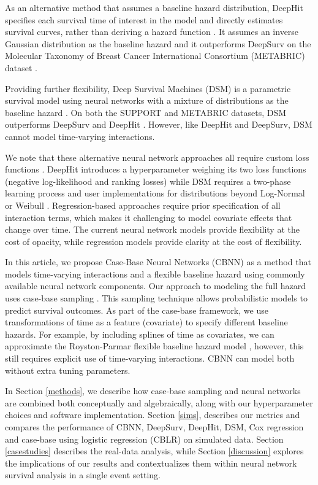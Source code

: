 \documentclass[AMA,STIX1COL,]{WileyNJD-v2}
\begin{document}
As an alternative method that assumes a baseline hazard distribution,
DeepHit specifies each survival time of interest in the model and
directly estimates survival curves, rather than deriving a hazard
function \citep{lee2018DeepHit}. It assumes an inverse Gaussian
distribution as the baseline hazard and it outperforms DeepSurv on the
Molecular Taxonomy of Breast Cancer International Consortium (METABRIC)
dataset \citep{curtis2012genomic}.

Providing further flexibility, Deep Survival Machines (DSM) is a
parametric survival model using neural networks with a mixture of
distributions as the baseline hazard \citep{dsmPaper}. On both the
SUPPORT and METABRIC datasets, DSM outperforms DeepSurv and DeepHit
\citep{dsmPaper}. However, like DeepHit and DeepSurv, DSM cannot model
time-varying interactions.

We note that these alternative neural network approaches all require
custom loss functions \citep{katzman2018DeepSurv} \citep{lee2018DeepHit}
\citep{dsmPaper}. DeepHit introduces a hyperparameter weighing its two
loss functions (negative log-likelihood and ranking losses) while DSM
requires a two-phase learning process and user implementations for
distributions beyond Log-Normal or Weibull \citep{lee2018DeepHit}
\citep{dsmPaper}. Regression-based approaches require prior
specification of all interaction terms, which makes it challenging to
model covariate effects that change over time. The current neural
network models provide flexibility at the cost of opacity, while
regression models provide clarity at the cost of flexibility.

In this article, we propose Case-Base Neural Networks (CBNN) as a method
that models time-varying interactions and a flexible baseline hazard
using commonly available neural network components. Our approach to
modeling the full hazard uses case-base sampling \citep{hanley2009}.
This sampling technique allows probabilistic models to predict survival
outcomes. As part of the case-base framework, we use transformations of
time as a feature (covariate) to specify different baseline hazards. For
example, by including splines of time as covariates, we can approximate
the Royston-Parmar flexible baseline hazard model
\citep{royston2002flexible}, however, this still requires explicit use
of time-varying interactions. CBNN can model both without extra tuning
parameters.

In Section \ref{methods}, we describe how case-base sampling and neural
networks are combined both conceptually and algebraically, along with
our hyperparameter choices and software implementation. Section
\ref{sims}, describes our metrics and compares the performance of CBNN,
DeepSurv, DeepHit, DSM, Cox regression and case-base using logistic
regression (CBLR) on simulated data. Section \ref{casestudies} describes
the real-data analysis, while Section \ref{discussion} explores the
implications of our results and contextualizes them within neural
network survival analysis in a single event setting.
\end{document}
